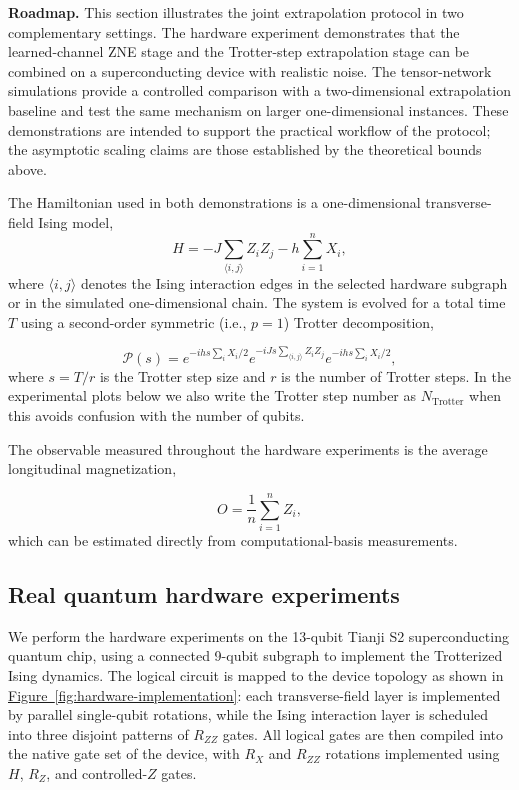 \documentclass[aps,pra,reprint,groupedaddress,floatfix]{revtex4-2}
\newcommand{\fig}[1]{\hyperref[fig:#1]{Figure~\ref*{fig:#1}}}
\begin{document}
\noindent\textbf{Roadmap.} This section illustrates the joint extrapolation protocol in two complementary settings. The hardware experiment demonstrates that the learned-channel ZNE stage and the Trotter-step extrapolation stage can be combined on a superconducting device with realistic noise. The tensor-network simulations provide a controlled comparison with a two-dimensional extrapolation baseline and test the same mechanism on larger one-dimensional instances. These demonstrations are intended to support the practical workflow of the protocol; the asymptotic scaling claims are those established by the theoretical bounds above.

The Hamiltonian used in both demonstrations is a one-dimensional transverse-field Ising model,
\begin{equation*}
    H = -J \sum_{\langle i,j\rangle} Z_i Z_j - h \sum_{i=1}^{n} X_i,
\end{equation*}
where $\langle i,j\rangle$ denotes the Ising interaction edges in the selected hardware subgraph or in the simulated one-dimensional chain. The system is evolved for a total time $T$ using a second-order symmetric (i.e., $p=1$) Trotter decomposition,

\begin{equation*}
    \mathcal{P}(s) =
    e^{-i h s \sum_i X_i/2}
    e^{-i J s \sum_{\langle i,j\rangle} Z_i Z_j}
    e^{-i h s \sum_i X_i/2},
\end{equation*}
where $s = T/r$ is the Trotter step size and $r$ is the number of Trotter steps.
In the experimental plots below we also write the Trotter step number as $N_{\mathrm{Trotter}}$ when this avoids confusion with the number of qubits.

The observable measured throughout the hardware experiments is the average longitudinal magnetization,

\begin{equation*}
O=\frac{1}{n} \sum_{i=1}^n Z_i,
\end{equation*}
which can be estimated directly from computational-basis measurements.

\subsection{Real quantum hardware experiments}
We perform the hardware experiments on the 13-qubit Tianji S2 superconducting quantum chip, using a connected 9-qubit subgraph to implement the Trotterized Ising dynamics. The logical circuit is mapped to the device topology as shown in \fig{hardware-implementation}: each transverse-field layer is implemented by parallel single-qubit rotations, while the Ising interaction layer is scheduled into three disjoint patterns of $R_{ZZ}$ gates. All logical gates are then compiled into the native gate set of the device, with $R_X$ and $R_{ZZ}$ rotations implemented using $H$, $R_Z$, and controlled-$Z$ gates.
\end{document}
